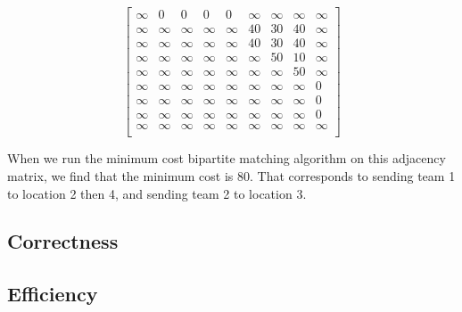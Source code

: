 \documentclass[12pt]{article}
\begin{document}
\begin{center}
    \[
        \begin{bmatrix}
            \infty & 0 & 0 & 0 & 0 & \infty & \infty & \infty & \infty \\
            \infty & \infty & \infty & \infty & \infty & 40 & 30 & 40 & \infty \\
            \infty & \infty & \infty & \infty & \infty & 40 & 30 & 40 & \infty \\
            \infty & \infty & \infty & \infty & \infty & \infty & 50 & 10 & \infty \\
            \infty & \infty & \infty & \infty & \infty & \infty & \infty & 50 & \infty \\
            \infty & \infty & \infty & \infty & \infty & \infty & \infty & \infty & 0 \\
            \infty & \infty & \infty & \infty & \infty & \infty & \infty & \infty & 0 \\
            \infty & \infty & \infty & \infty & \infty & \infty & \infty & \infty & 0 \\
            \infty & \infty & \infty & \infty & \infty & \infty & \infty & \infty & \infty \\
        \end{bmatrix}
    \]
\end{center}

When we run the minimum cost bipartite matching algorithm on this adjacency
matrix, we find that the minimum cost is 80. That corresponds to sending
team 1 to location 2 then 4, and sending team 2 to location 3.

\subsection{Correctness}

\subsection{Efficiency}

\end{document}

